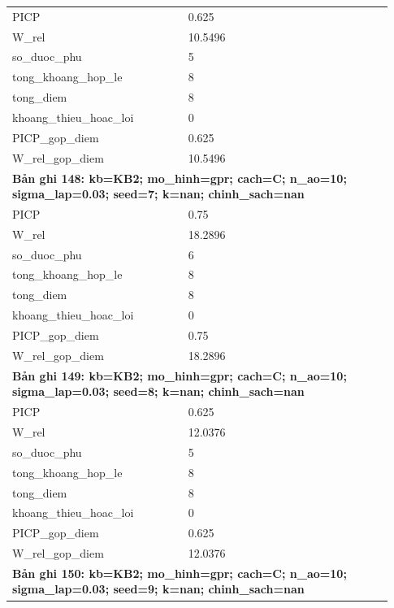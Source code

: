 \begin{longtable}{p{0.43\linewidth}p{0.50\linewidth}}
PICP & 0.625 \\
W\_\allowbreak rel & 10.5496 \\
so\_\allowbreak duoc\_\allowbreak phu & 5 \\
tong\_\allowbreak khoang\_\allowbreak hop\_\allowbreak le & 8 \\
tong\_\allowbreak diem & 8 \\
khoang\_\allowbreak thieu\_\allowbreak hoac\_\allowbreak loi & 0 \\
PICP\_\allowbreak gop\_\allowbreak diem & 0.625 \\
W\_\allowbreak rel\_\allowbreak gop\_\allowbreak diem & 10.5496 \\
\midrule
\multicolumn{2}{p{0.95\linewidth}}{\textbf{Bản ghi 148: kb=KB2; mo\_hinh=gpr; cach=C; n\_ao=10; sigma\_lap=0.03; seed=7; k=nan; chinh\_sach=nan}} \\
PICP & 0.75 \\
W\_\allowbreak rel & 18.2896 \\
so\_\allowbreak duoc\_\allowbreak phu & 6 \\
tong\_\allowbreak khoang\_\allowbreak hop\_\allowbreak le & 8 \\
tong\_\allowbreak diem & 8 \\
khoang\_\allowbreak thieu\_\allowbreak hoac\_\allowbreak loi & 0 \\
PICP\_\allowbreak gop\_\allowbreak diem & 0.75 \\
W\_\allowbreak rel\_\allowbreak gop\_\allowbreak diem & 18.2896 \\
\midrule
\multicolumn{2}{p{0.95\linewidth}}{\textbf{Bản ghi 149: kb=KB2; mo\_hinh=gpr; cach=C; n\_ao=10; sigma\_lap=0.03; seed=8; k=nan; chinh\_sach=nan}} \\
PICP & 0.625 \\
W\_\allowbreak rel & 12.0376 \\
so\_\allowbreak duoc\_\allowbreak phu & 5 \\
tong\_\allowbreak khoang\_\allowbreak hop\_\allowbreak le & 8 \\
tong\_\allowbreak diem & 8 \\
khoang\_\allowbreak thieu\_\allowbreak hoac\_\allowbreak loi & 0 \\
PICP\_\allowbreak gop\_\allowbreak diem & 0.625 \\
W\_\allowbreak rel\_\allowbreak gop\_\allowbreak diem & 12.0376 \\
\midrule
\multicolumn{2}{p{0.95\linewidth}}{\textbf{Bản ghi 150: kb=KB2; mo\_hinh=gpr; cach=C; n\_ao=10; sigma\_lap=0.03; seed=9; k=nan; chinh\_sach=nan}} \\

\end{longtable}
